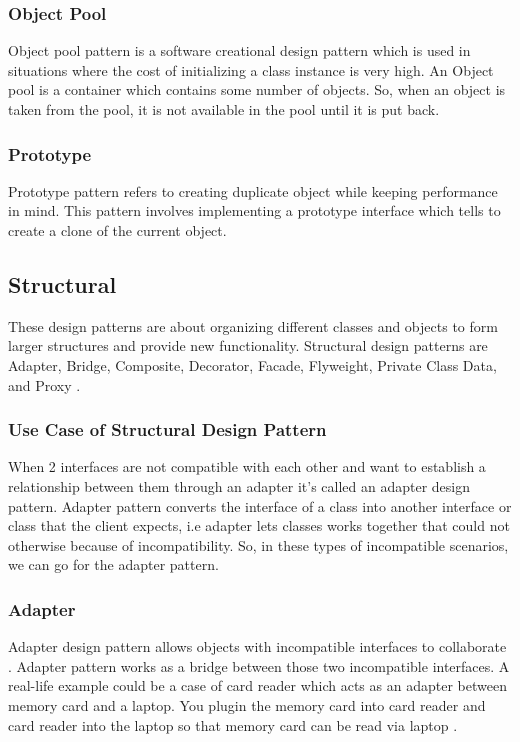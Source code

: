 \documentclass[sigplan,12pt,nonacm=true,review=false]{acmart}
\begin{document}
\subsubsection{Object Pool}
Object pool pattern is a software creational design pattern which is used in situations where the cost of initializing a class instance is very high. An Object pool is a container which contains some number of objects. So, when an object is taken from the pool, it is not available in the pool until it is put back.

\subsubsection{Prototype}
Prototype pattern refers to creating duplicate object while keeping performance in mind. This pattern involves implementing a prototype interface which tells to create a clone of the current object.

\subsection{Structural}
These design patterns are about organizing different classes and objects to form larger structures and provide new functionality. Structural design patterns are Adapter, Bridge, Composite, Decorator, Facade, Flyweight, Private Class Data, and Proxy \cite{kuchana_software_2004, zimmer_relationships_1995}.

\subsubsection{Use Case of Structural Design Pattern}
When 2 interfaces are not compatible with each other and want to establish a relationship between them through an adapter it’s called an adapter design pattern. Adapter pattern converts the interface of a class into another interface or class that the client expects, i.e adapter lets classes works together that could not otherwise because of incompatibility. So, in these types of incompatible scenarios, we can go for the adapter pattern.

\subsubsection{Adapter}
Adapter design pattern allows objects with incompatible interfaces to collaborate \cite{tichy_catalogue_1997}. Adapter pattern works as a bridge between those two incompatible interfaces. A real-life example could be a case of card reader which acts as an adapter between memory card and a laptop. You plugin the memory card into card reader and card reader into the laptop so that memory card can be read via laptop \cite{noauthor_design_nodate-5}.  
\end{document}
